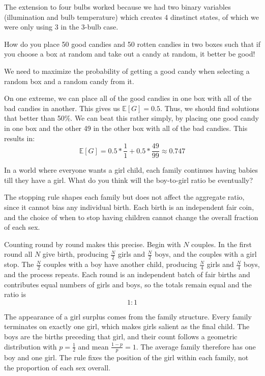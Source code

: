 The extension to four bulbs worked because we had two binary variables (illumination and bulb temperature) which creates 4 dinstinct states, of which we were only using 3 in the 3-bulb case.

\medskip

\begin{problem}[Easy]
How do you place 50 good candies and 50 rotten candies in two boxes such that if you choose a box at random and take out a candy at random, it better be good!

We need to maximize the probability of getting a good candy when selecting a random box and a random candy from it.
\end{problem}

\begin{solution}
On one extreme, we can place all of the good candies in one box with all of the bad candies in another. This gives us $\mathbb{E}[G] = 0.5$. Thus, we should find solutions that better than 50\%. We can beat this rather simply, by placing one good candy in one box and the other 49 in the other box with all of the bad candies. This results in:
\[
\mathbb{E}[G] = 0.5 * \frac{1}{1} + 0.5 * \frac{49}{99} \approx 0.747
\]
\end{solution}

\begin{problem}[Easy]
In a world where everyone wants a girl child, each family continues having babies till they have a girl. What do you think will the boy-to-girl ratio be eventually? 
\end{problem}

\begin{solution}
The stopping rule shapes each family but does not affect the aggregate ratio, since it cannot bias any individual birth. Each birth is an independent fair coin, and the choice of when to stop having children cannot change the overall fraction of each sex.

Counting round by round makes this precise. Begin with $N$ couples. In the first round all $N$ give birth, producing $\tfrac{N}{2}$ girls and $\tfrac{N}{2}$ boys, and the couples with a girl stop. The $\tfrac{N}{2}$ couples with a boy have another child, producing $\tfrac{N}{4}$ girls and $\tfrac{N}{4}$ boys, and the process repeats. Each round is an independent batch of fair births and contributes equal numbers of girls and boys, so the totals remain equal and the ratio is
\[
1 : 1
\]

The appearance of a girl surplus comes from the family structure. Every family terminates on exactly one girl, which makes girls salient as the final child. The boys are the births preceding that girl, and their count follows a geometric distribution with $p = \tfrac{1}{2}$ and mean $\tfrac{1-p}{p} = 1$. The average family therefore has one boy and one girl. The rule fixes the position of the girl within each family, not the proportion of each sex overall.
\end{solution}


